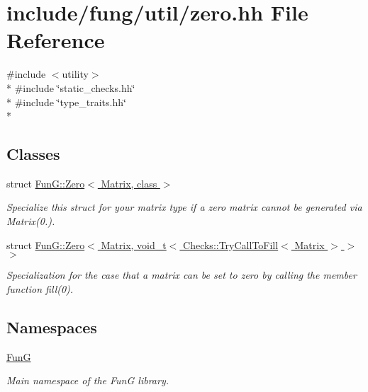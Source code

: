 \hypertarget{zero_8hh}{}\section{include/fung/util/zero.hh File Reference}
\label{zero_8hh}
{\ttfamily \#include $<$utility$>$}\\*
{\ttfamily \#include \char`\"{}static\+\_\+checks.\+hh\char`\"{}}\\*
{\ttfamily \#include \char`\"{}type\+\_\+traits.\+hh\char`\"{}}\\*
\subsection*{Classes}
\begin{DoxyCompactItemize}
\item 
struct \hyperlink{structFunG_1_1Zero}{Fun\+G\+::\+Zero$<$ Matrix, class $>$}
\begin{DoxyCompactList}\small\item\em Specialize this struct for your matrix type if a zero matrix cannot be generated via Matrix(0.). \end{DoxyCompactList}\item 
struct \hyperlink{structFunG_1_1Zero_3_01Matrix_00_01void__t_3_01Checks_1_1TryCallToFill_3_01Matrix_01_4_01_4_01_4}{Fun\+G\+::\+Zero$<$ Matrix, void\+\_\+t$<$ Checks\+::\+Try\+Call\+To\+Fill$<$ Matrix $>$ $>$ $>$}
\begin{DoxyCompactList}\small\item\em Specialization for the case that a matrix can be set to zero by calling the member function fill(0). \end{DoxyCompactList}\end{DoxyCompactItemize}
\subsection*{Namespaces}
\begin{DoxyCompactItemize}
\item 
 \hyperlink{namespaceFunG}{FunG}
\begin{DoxyCompactList}\small\item\em Main namespace of the FunG library. \end{DoxyCompactList}\end{DoxyCompactItemize}
